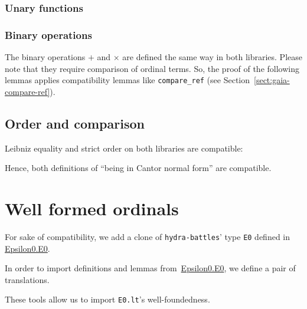 
\subsubsection{Unary functions}


\subsubsection{Binary operations}
The binary operations $+$ and $\times$ are defined the same way in both libraries. Please note that they require comparison of ordinal terms. So, the proof of the following lemmas applies
compatibility lemmas like \texttt{compare\_ref} (see Section~\vref{sect:gaia-compare-ref}).



\subsection{Order and comparison}
Leibniz equality and strict order on both libraries are
compatible:

\label{sect:gaia-compare-ref}



Hence, both definitions of ``being in Cantor normal form'' are
compatible.


\section{Well formed ordinals}
For sake of compatibility, we add a clone of \texttt{hydra-battles}' type \texttt{E0} defined in \href{../theories/html/hydras.Epsilon0.E0.html}{Epsilon0.E0}.


In order to import definitions and lemmas
from~\href{../theories/html/hydras.Epsilon0.E0.html}{Epsilon0.E0}, we define a pair of translations.


These tools allow us to import \texttt{E0.lt}'s  well-foundedness.

